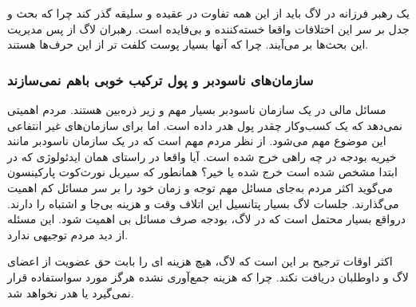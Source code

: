 یک رهبر فرزانه در لاگ باید از این همه تفاوت در عقیده و سلیقه گذر کند چرا که بحث و جدل
بر سر این اختلافات واقعا خسته‌کننده و بی‌فایده است. رهبران لاگ از پس مدیریت این بحث‌ها 
بر می‌آیند. چرا که آنها بسیار پوست کلفت تر از این حرف‌ها هستند.

\subsubsection{سازمان‌های ناسودبر و پول ترکیب خوبی باهم نمی‌سازند}

مسائل مالی در یک سازمان ناسودبر بسیار مهم و زیر ذره‌بین هستند. مردم اهمیتی نمی‌دهد
که یک کسب‌وکار چقدر پول هدر داده است. اما برای سازمان‌های غیر انتفاعی این موضوع مهم می‌شود.
از نظر مردم مهم است که در یک سازمان ناسودبر مانند خیریه بودجه در چه راهی خرج شده است.
آیا واقعا در راستای همان ایدئولوژی که در ابتدا مشخص شده است خرج شده یا خیر؟
همانطور که سیریل نورث‌کوت پارکینسون می‌گوید
اکثر مردم به‌جای مسائل مهم توجه و زمان خود را بر سر مسائل کم اهمیت می‌گذارند.
جلسات لاگ بسیار پتانسیل این اتلاف وقت و هزینه بی‌جا و اشتباه را دارند. درواقع بسیار محتمل است
که در لاگ، بودجه صرف مسائل بی اهمیت شود. این مسئله از دید مردم توجیهی ندارد.

اکثر اوقات ترجیح بر این است که لاگ، هیچ هزینه ای را بابت حق عضویت از اعضای لاگ و داوطلبان دریافت نکند.
چرا که هزینه جمع‌آوری نشده هرگز مورد سواستفاده قرار نمی‌گیرد یا هدر نخواهد شد.

